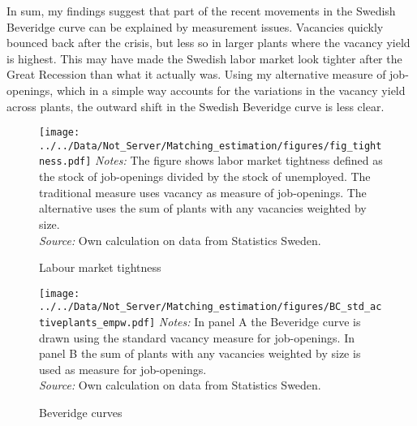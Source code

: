 In sum, my findings suggest that part of the recent movements in the Swedish Beveridge curve can be explained by measurement issues. Vacancies quickly bounced back after the crisis, but less so in larger plants where the vacancy yield is highest. This may have made the Swedish labor market look tighter after the Great Recession than what it actually was. Using my alternative measure of job-openings, which in a simple way accounts for the variations in the vacancy yield across plants, the outward shift in the Swedish Beveridge curve is less clear. 

\begin{figure}[h]
\centering
\caption{Labour market tightness}
\texttt{[image: ../../Data/Not\_Server/Matching\_estimation/figures/fig\_tightness.pdf]}
\flushleft
\footnotesize{\emph{Notes:} The figure shows labor market tightness defined as the stock of job-openings divided by the stock of unemployed. The traditional measure uses vacancy as measure of job-openings. The alternative uses the sum of plants with any vacancies weighted by size.} \\
\footnotesize{\emph{Source:} Own calculation on data from Statistics Sweden.}
\label{fig:tightness}
\end{figure}

\begin{figure}[h]
\centering
\caption{Beveridge curves}
\texttt{[image: ../../Data/Not\_Server/Matching\_estimation/figures/BC\_std\_activeplants\_empw.pdf]}
\flushleft
\footnotesize{\emph{Notes:} In panel A the Beveridge curve is drawn using the standard vacancy measure for job-openings. In panel B the sum of plants with any vacancies weighted by size is used as measure for job-openings.} \\
\footnotesize{\emph{Source:} Own calculation on data from Statistics Sweden.}
\label{fig:Beveridge}
\end{figure}
